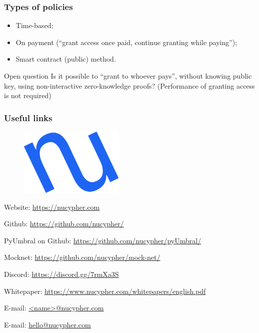 \documentclass[xetex,mathsans,sans,aspectratio=169]{beamer}
\begin{document}
    \begin{frame}
        \frametitle{Types of policies}
        \begin{itemize}
            \item Time-based;
            \item On payment (``grant access once paid, continue granting while paying'');
            \item Smart contract (public) method.
        \end{itemize}

        \begin{block}{Open question}
            Is it possible to ``grant to whoever pays'', without knowing public key, using non-interactive zero-knowledge proofs?
            (Performance of granting access is not required)
        \end{block}
    \end{frame}

    \begin{frame}
        \frametitle{Useful links}
        \begin{figure}
            \centering
            \includegraphics[width=5cm]{pdf/nucypher_logo.pdf}
        \end{figure}
        Website: \url{https://nucypher.com}

        Github: \url{https://github.com/nucypher/}

        PyUmbral on Github: \url{https://github.com/nucypher/pyUmbral/}

        Mocknet: \url{https://github.com/nucypher/mock-net/}

        Discord: \url{https://discord.gg/7rmXa3S}

        Whitepaper: \url{https://www.nucypher.com/whitepapers/english.pdf}

        E-mail: \url{<name>@nucypher.com}

        E-mail: \url{hello@nucypher.com}
    \end{frame}
\end{document}
